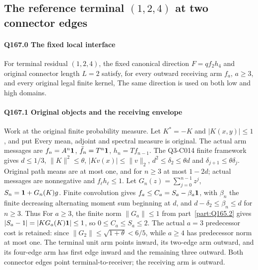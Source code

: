 \subsection{The reference terminal $(1,\allowbreak 2,\allowbreak 4)$ at two connector edges}\label{proof:Q5-C167}
\paragraph{Q167.0 The fixed local interface}\label{part:Q167.0}
For terminal residual $(1,\allowbreak 2,\allowbreak 4)$, the fixed canonical direction
$F=\allowbreak qf_2h_4$ and original connector length $L=\allowbreak 2$ satisfy, for every
outward receiving arm $f_a$, $a\ge\allowbreak 3$, and every original legal finite kernel,
The same direction is used on both low and high domains.

\paragraph{Q167.1 Original objects and the receiving envelope}\label{part:Q167.1}
Work at the original finite probability measure. Let $K^*=\allowbreak -K$ and
$|K(x,\allowbreak y)|\le\allowbreak 1$, and put
Every mean, adjoint and spectral measure is original.
The actual arm messages are $f_n=\allowbreak A^n\mathbf1$, $\bar f_n=\allowbreak T^n\mathbf1$,
$h_n=\allowbreak Tf_{n-1}$. The Q3-C014 finite framework gives $d\le\allowbreak 1/3$,
$\|K\|^2\le\allowbreak \theta$, $|Kv(x)|\le\allowbreak \|v\|_2$,
$d^2\le\allowbreak \delta_2\le\allowbreak \theta d$ and $\delta_{j+1}\le\allowbreak \theta\delta_j$.
Original path means are at most one, and for $n\ge\allowbreak 3$ at most $1-2d$;
actual messages are nonnegative and $f_\ell h_\ell\le\allowbreak 1$.
Let $G_n(z)=\allowbreak \sum_{j=\allowbreak 0}^{n-1}z^j$, $S_n=\allowbreak \mathbf1+G_n(K)g$.
Finite convolution gives $f_a\le\allowbreak  C_a=\allowbreak S_a-\beta_a\mathbf1$, with
$\beta_n$ the finite decreasing alternating moment sum beginning at $d$,
and $d-\delta_2\le\allowbreak \beta_n\le\allowbreak  d$ for $n\ge\allowbreak 3$.
Thus
For $a\ge\allowbreak 3$, the finite norm $\|G_a\|\le\allowbreak 1$ from
part~\ref{part:Q165.2} gives
$|S_a-1|=\allowbreak |KG_a(K)\mathbf1|\le\allowbreak 1$, so $0\le\allowbreak  C_a\le\allowbreak  S_a\le\allowbreak 2$.
The actual $a=\allowbreak 3$ predecessor cost is retained:
since $\|G_2\|\le\allowbreak \sqrt{1+\theta}<\allowbreak 6/5$, while $a\ge\allowbreak 4$ has predecessor
norm at most one.
The terminal unit arm points inward, its two-edge arm outward, and its
four-edge arm has first edge inward and the remaining three outward.
Both connector edges point terminal-to-receiver; the receiving arm is outward.

